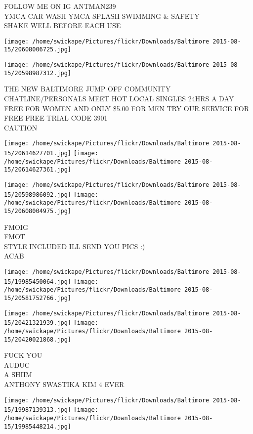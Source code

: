 \documentclass[10pt,letterpaper]{article}
\begin{document}
FOLLOW ME ON IG ANTMAN239\\
YMCA CAR WASH YMCA SPLASH SWIMMING \& SAFETY\\
SHAKE WELL BEFORE EACH USE\\
\pagebreak

\texttt{[image: /home/swickape/Pictures/flickr/Downloads/Baltimore 2015-08-15/20608006725.jpg]}

\vspace{0.25in}
\texttt{[image: /home/swickape/Pictures/flickr/Downloads/Baltimore 2015-08-15/20598987312.jpg]}

THE NEW BALTIMORE JUMP OFF COMMUNITY CHATLINE/PERSONALS MEET HOT LOCAL SINGLES 24HRS A DAY FREE FOR WOMEN AND ONLY \$5.00 FOR MEN TRY OUR SERVICE FOR FREE FREE TRIAL CODE 3901\\
CAUTION\\
\pagebreak

\texttt{[image: /home/swickape/Pictures/flickr/Downloads/Baltimore 2015-08-15/20614627701.jpg]}
\texttt{[image: /home/swickape/Pictures/flickr/Downloads/Baltimore 2015-08-15/20614627361.jpg]}

\texttt{[image: /home/swickape/Pictures/flickr/Downloads/Baltimore 2015-08-15/20598986092.jpg]}
\texttt{[image: /home/swickape/Pictures/flickr/Downloads/Baltimore 2015-08-15/20608004975.jpg]}

FMOIG\\
FMOT\\
STYLE INCLUDED ILL SEND YOU PICS :)\\
ACAB\\
\pagebreak

\texttt{[image: /home/swickape/Pictures/flickr/Downloads/Baltimore 2015-08-15/19985450064.jpg]}
\texttt{[image: /home/swickape/Pictures/flickr/Downloads/Baltimore 2015-08-15/20581752766.jpg]}

\texttt{[image: /home/swickape/Pictures/flickr/Downloads/Baltimore 2015-08-15/20421321939.jpg]}
\texttt{[image: /home/swickape/Pictures/flickr/Downloads/Baltimore 2015-08-15/20420021868.jpg]}

FUCK YOU\\
AUDUC\\
A SHIIM\\
ANTHONY SWASTIKA KIM 4 EVER\\
\pagebreak

\texttt{[image: /home/swickape/Pictures/flickr/Downloads/Baltimore 2015-08-15/19987139313.jpg]}
\texttt{[image: /home/swickape/Pictures/flickr/Downloads/Baltimore 2015-08-15/19985448214.jpg]}
\end{document}
